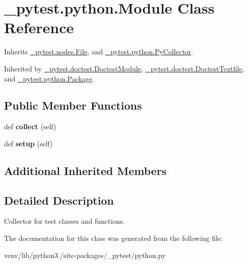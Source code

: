 \hypertarget{class__pytest_1_1python_1_1_module}{}\section{\+\_\+pytest.\+python.\+Module Class Reference}
\label{class__pytest_1_1python_1_1_module}


Inherits \hyperlink{class__pytest_1_1nodes_1_1_file}{\+\_\+pytest.\+nodes.\+File}, and \hyperlink{class__pytest_1_1python_1_1_py_collector}{\+\_\+pytest.\+python.\+Py\+Collector}.



Inherited by \hyperlink{class__pytest_1_1doctest_1_1_doctest_module}{\+\_\+pytest.\+doctest.\+Doctest\+Module}, \hyperlink{class__pytest_1_1doctest_1_1_doctest_textfile}{\+\_\+pytest.\+doctest.\+Doctest\+Textfile}, and \hyperlink{class__pytest_1_1python_1_1_package}{\+\_\+pytest.\+python.\+Package}.

\subsection*{Public Member Functions}
\begin{DoxyCompactItemize}
\item 
\mbox{\label{class__pytest_1_1python_1_1_module_a455cf00066c57a1ba9326e70dbdcec8c}} 
def {\bfseries collect} (self)
\item 
\mbox{\label{class__pytest_1_1python_1_1_module_a87b5095a9028746812670e7aaba5212d}} 
def {\bfseries setup} (self)
\end{DoxyCompactItemize}
\subsection*{Additional Inherited Members}


\subsection{Detailed Description}
\begin{DoxyVerb}Collector for test classes and functions. \end{DoxyVerb}
 

The documentation for this class was generated from the following file\+:\begin{DoxyCompactItemize}
\item 
venv/lib/python3./site-\/packages/\+\_\+pytest/python.\+py\end{DoxyCompactItemize}

